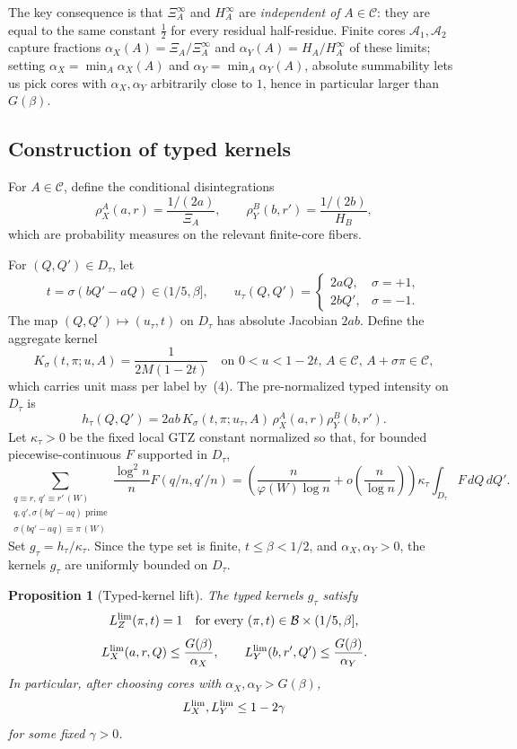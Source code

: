 \documentclass[11pt]{article}
\newtheorem{proposition}[theorem]{Proposition}
\newcommand{\B}{\mathcal B}
\newcommand{\C}{\mathcal C}
\begin{document}
The key consequence is that \(\Xi_A^\infty\) and \(H_A^\infty\) are
\emph{independent of} \(A\in\C\): they are equal to the same constant
\(\tfrac12\) for every residual half-residue.  Finite cores
\(\mathcal A_1,\mathcal A_2\) capture fractions
\(\alpha_X(A)=\Xi_A/\Xi_A^\infty\) and \(\alpha_Y(A)=H_A/H_A^\infty\) of these
limits; setting \(\alpha_X=\min_A\alpha_X(A)\) and
\(\alpha_Y=\min_A\alpha_Y(A)\), absolute summability lets us pick cores with
\(\alpha_X,\alpha_Y\) arbitrarily close to \(1\), hence in particular larger
than \(G(\beta)\).

\subsection*{Construction of typed kernels}

For \(A\in\C\), define the conditional disintegrations
\[
  \rho_X^A(a,r)=\frac{1/(2a)}{\Xi_A},\qquad
  \rho_Y^B(b,r')=\frac{1/(2b)}{H_B},
\]
which are probability measures on the relevant finite-core fibers.

For \((Q,Q')\in D_\tau\), let
\[
  t=\sigma(bQ'-aQ)\in(1/5,\beta],
  \qquad
  u_\tau(Q,Q')=
  \begin{cases}2aQ,&\sigma=+1,\\ 2bQ',&\sigma=-1.\end{cases}
\]
The map \((Q,Q')\mapsto(u_\tau,t)\) on \(D_\tau\) has absolute Jacobian
\(2ab\).  Define the aggregate kernel
\[
  K_\sigma(t,\pi;u,A)=\frac1{2M(1-2t)}
  \quad\text{on }0<u<1-2t,\,A\in\C,\,A+\sigma\pi\in\C,
\]
which carries unit mass per label by~(4).  The pre-normalized typed intensity
on \(D_\tau\) is
\[
  h_\tau(Q,Q')
  =2ab\,K_\sigma(t,\pi;u_\tau,A)\,\rho_X^A(a,r)\rho_Y^B(b,r').
\]
Let \(\kappa_\tau>0\) be the fixed local GTZ constant normalized so that, for
bounded piecewise-continuous \(F\) supported in \(D_\tau\),
\[
  \sum_{\substack{q\equiv r,\,q'\equiv r'\,(W)\\ q,q',\sigma(bq'-aq)\text{ prime}\\
                   \sigma(bq'-aq)\equiv\pi\,(W)}}
  \frac{\log^2 n}{n}F(q/n,q'/n)
  =
  \left(\frac{n}{\varphi(W)\log n}+o\!\left(\frac n{\log n}\right)\right)
  \kappa_\tau\int_{D_\tau}F\,dQ\,dQ'.
\]
Set \(g_\tau=h_\tau/\kappa_\tau\).  Since the type set is finite,
\(t\le\beta<1/2\), and \(\alpha_X,\alpha_Y>0\), the kernels \(g_\tau\) are
uniformly bounded on \(D_\tau\).

\begin{proposition}[Typed-kernel lift]
The typed kernels \(g_\tau\) satisfy
\[
  L_Z^{\rm lim}(\pi,t)=1
  \quad\text{for every }(\pi,t)\in\B\times(1/5,\beta],
\]
\[
  L_X^{\rm lim}(a,r,Q)\le\frac{G(\beta)}{\alpha_X},\qquad
  L_Y^{\rm lim}(b,r',Q')\le\frac{G(\beta)}{\alpha_Y}.
\]
In particular, after choosing cores with \(\alpha_X,\alpha_Y>G(\beta)\),
\[
  L_X^{\rm lim},L_Y^{\rm lim}\le 1-2\gamma
\]
for some fixed \(\gamma>0\).
\end{proposition}
\end{document}
